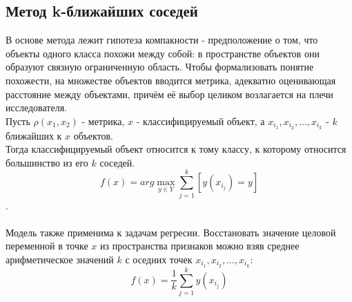 \documentclass{article}
\begin{document}
    \subsection*{Метод k-ближайших соседей \citep{elements_of_statistical_learning}}
        В основе метода лежит гипотеза компакности - предположение о том, что объекты одного класса похожи между собой: в пространстве объектов они образуют связную ограниченную область. Чтобы формализовать понятие похожести, на множестве объектов вводится метрика, адекватно оценивающая расстояние между объектами, причём её выбор целиком возлагается на плечи исследователя. \\
        Пусть $\rho(x_1, x_2)$ - метрика, $x$ - классифицируемый объект, а $x_{i_1}, x_{i_2}, \dots, x_{i_k}$ - $k$ ближайших к $x$ объектов. \\
        Тогда классифицируемый объект относится к тому классу, к которому относится большинство из его $k$ соседей. \\
        $$f(x) = arg \max\limits_{y \in Y} \sum\limits_{j = 1}^k [y(x_{i_j}) = y]$$.
        \\\\
        Модель также применима к задачам регресии. Восстановать значение целовой переменной в точке $x$ из пространства признаков можно взяв среднее арифметическое значений $k$ с оседних точек $x_{i_1}, x_{i_2}, \dots, x_{i_k}$:
        $$f(x) = \frac{1}{k} \sum\limits_{j = 1}^k y(x_{i_j})$$
        
        
\end{document}

